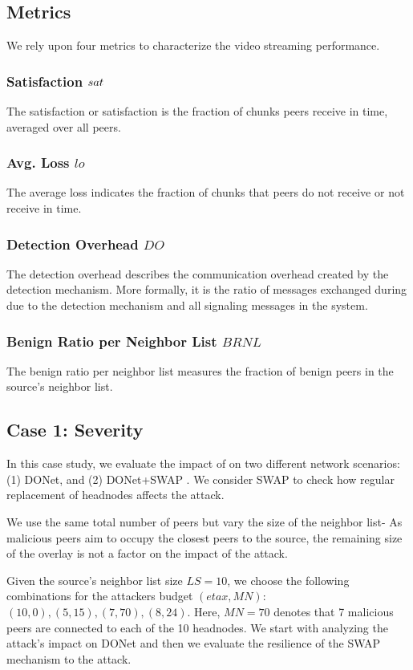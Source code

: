 \subsection{Metrics}

We rely upon four metrics to characterize the video streaming performance.

\subsubsection*{Satisfaction $sat$} The satisfaction or satisfaction is the fraction of chunks peers receive in time, averaged over all peers. 
\subsubsection*{Avg. Loss $lo$} The average loss indicates the fraction of chunks that peers do not receive or not receive in time. 
\subsubsection*{Detection Overhead $DO$} The detection overhead describes the communication overhead created by the detection mechanism. More formally, it is the ratio of messages exchanged during due to the detection mechanism and all signaling messages in the system.
\subsubsection*{Benign Ratio per Neighbor List $BRNL$} The benign ratio per neighbor list measures the fraction of benign peers in the source's neighbor list.

\subsection{Case 1: \drop Severity}

In this case study, we evaluate the impact of \drop on two different network scenarios:  (1) DONet, and (2) DONet+SWAP \cite{nguyen2016swap}. We consider SWAP to check  how regular replacement of headnodes affects the attack. 

We use the same total number of peers but vary the size of the neighbor list- 
As malicious peers aim to occupy the closest peers to the source, the remaining size of the overlay is not a factor on the impact of the \drop attack.
  

Given the source's neighbor list size $LS=10$, we choose the following combinations for the attackers budget $(eta x, MN)$: $(10,0), (5,15), (7,70), (8,24)$.
Here, $MN=70$ denotes that 7 malicious peers are connected to each of the 10 headnodes.
We start with analyzing the attack's impact on DONet and then we evaluate the resilience of the SWAP mechanism to the attack.

